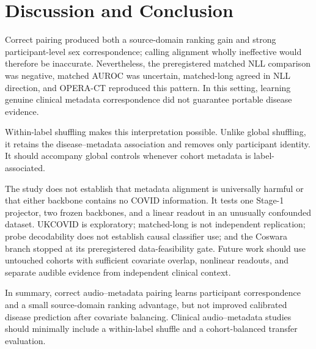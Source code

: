 \documentclass{article}
\begin{document}
\section{Discussion and Conclusion}
Correct pairing produced both a source-domain ranking gain and strong participant-level sex
correspondence; calling alignment wholly ineffective would therefore be inaccurate.
Nevertheless, the preregistered matched NLL comparison was negative, matched AUROC was
uncertain, matched-long agreed in NLL direction, and OPERA-CT reproduced this pattern. In
this setting, learning genuine clinical metadata correspondence did not guarantee portable
disease evidence.

Within-label shuffling makes this interpretation possible. Unlike global shuffling, it
retains the disease--metadata association and removes only participant identity. It should
accompany global controls whenever cohort metadata is label-associated.

The study does not establish that metadata alignment is universally harmful or that either
backbone contains no COVID information. It tests one Stage-1 projector, two frozen
backbones, and a linear readout in an unusually confounded dataset. UKCOVID is exploratory;
matched-long is not independent replication; probe decodability does not establish causal classifier use;
and the Coswara branch stopped at its preregistered data-feasibility gate. Future work
should use untouched cohorts with sufficient covariate overlap, nonlinear readouts, and
separate audible evidence from independent clinical context.

In summary, correct audio--metadata pairing learns participant correspondence and a small
source-domain ranking advantage, but not improved calibrated disease prediction after
covariate balancing. Clinical audio--metadata studies should minimally include a
within-label shuffle and a cohort-balanced transfer evaluation.



\end{document}
